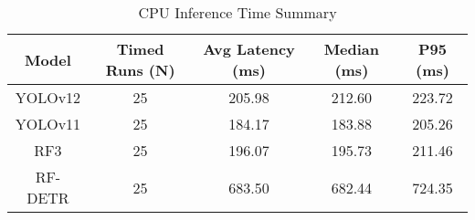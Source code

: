 \begin{table}[!ht]
\centering
\caption{CPU Inference Time Summary}
\label{tab:inference time}
\footnotesize
\setlength{\tabcolsep}{6pt}
\begin{tabular}{ccccc}
\toprule
\textbf{Model} & \textbf{Timed Runs (N)} & \textbf{Avg Latency (ms)} & \textbf{Median (ms)} & \textbf{P95 (ms)} \\
\midrule
YOLOv12 & 25 & 205.98 & 212.60 & 223.72 \\
YOLOv11 & 25 & 184.17 & 183.88 & 205.26 \\
RF3 & 25 & 196.07 & 195.73 & 211.46 \\
RF-DETR & 25 & 683.50 & 682.44 & 724.35 \\
\bottomrule
\end{tabular}
\end{table}